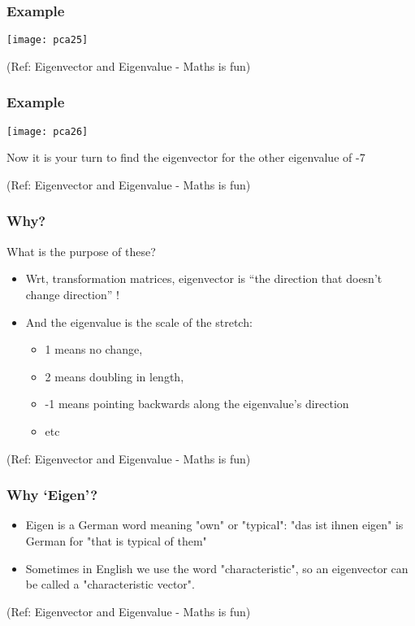 \begin{frame}[fragile]\frametitle{Example}

\begin{center}
\texttt{[image: pca25]}
\end{center}

{\tiny (Ref: Eigenvector and Eigenvalue - Maths is fun)}
\end{frame}

\begin{frame}[fragile]\frametitle{Example}

\begin{center}
\texttt{[image: pca26]}
\end{center}

Now it is your turn to find the eigenvector for the other eigenvalue of -7

{\tiny (Ref: Eigenvector and Eigenvalue - Maths is fun)}
\end{frame}

\begin{frame}[fragile]\frametitle{Why?}
What is the purpose of these?

\begin{itemize}
\item Wrt, transformation matrices, eigenvector is ``the direction that doesn't change direction'' !
\item And the eigenvalue is the scale of the stretch:
\begin{itemize}
\item 1 means no change,
\item 2 means doubling in length,
\item -1 means pointing backwards along the eigenvalue's direction
\item etc
\end{itemize}
\end{itemize}

{\tiny (Ref: Eigenvector and Eigenvalue - Maths is fun)}
\end{frame}

\begin{frame}[fragile]\frametitle{Why `Eigen'?}

\begin{itemize}
\item Eigen is a German word meaning "own" or "typical": "das ist ihnen eigen" is German for "that is typical of them"
\item Sometimes in English we use the word "characteristic", so an eigenvector can be called a "characteristic vector".
\end{itemize}

{\tiny (Ref: Eigenvector and Eigenvalue - Maths is fun)}
\end{frame}




